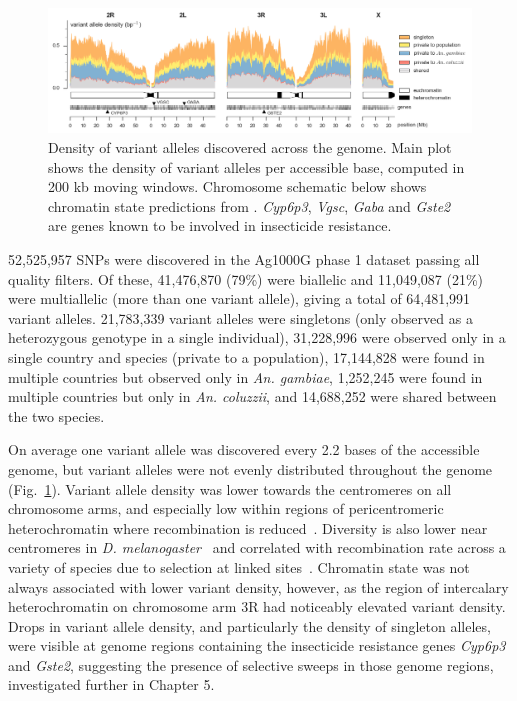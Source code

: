 \begin{refsection}
\begin{figure}[t!]
\centering
\includegraphics[width=1.1\textwidth,center]{artwork/chapter3/variant_density.png}
\caption{Density of variant alleles discovered across the genome.
%
Main plot shows the density of variant alleles per accessible base, computed in 200 kb moving windows.
%
Chromosome schematic below shows chromatin state predictions from \textcite{Sharakhova2010}.
%
\textit{Cyp6p3}, \textit{Vgsc}, \textit{Gaba} and \textit{Gste2} are genes known to be involved in insecticide resistance.
}
%
\label{fig:ch3-variant_density}
\end{figure}


52,525,957 SNPs were discovered in the Ag1000G phase 1 dataset passing all quality filters.
%
Of these, 41,476,870 (79\%) were biallelic and 11,049,087 (21\%) were multiallelic (more than one variant allele), giving a total of 64,481,991 variant alleles.
%
21,783,339 variant alleles were singletons (only observed as a heterozygous genotype in a single individual), 31,228,996 were observed only in a single country and species (private to a population), 17,144,828 were found in multiple countries but observed only in \textit{An. gambiae}, 1,252,245 were found in multiple countries but only in \textit{An. coluzzii}, and 14,688,252 were shared between the two species.


On average one variant allele was discovered every 2.2 bases of the accessible genome,
but variant alleles were not evenly distributed throughout the genome (Fig.~\ref{fig:ch3-variant_density}).
%
Variant allele density was lower towards the centromeres on all chromosome arms, and especially low within regions of pericentromeric heterochromatin where recombination is reduced~\parencite{Pombi2006,Zheng1997}.
%
Diversity is also lower near centromeres in \textit{D. melanogaster}~\parencite{Langley2012} and correlated with recombination rate across a variety of species due to selection at linked sites~\parencite{Charlesworth2012a,Elyashiv2016,
CorbettDetig2015,Burri2015,Chan2012,Spencer2006}.
%
Chromatin state was not always associated with lower variant density, however, as the region of intercalary heterochromatin on chromosome arm 3R had noticeably elevated variant density.
%
Drops in variant allele density, and particularly the density of singleton alleles, were visible at genome regions containing the insecticide resistance genes \textit{Cyp6p3} and \textit{Gste2}, suggesting the presence of selective sweeps in those genome regions, investigated further in Chapter 5.



\end{refsection}
